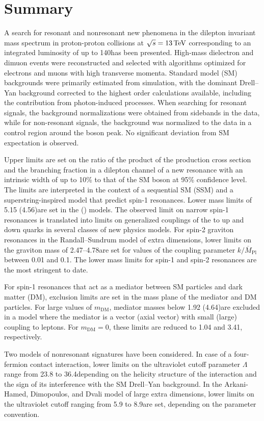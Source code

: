 \documentclass[11pt,twoside,a4paper,cmspaper,final,collab]{cms-tdr}
\begin{document}
\section{Summary}
A search for resonant and nonresonant new phenomena in the dilepton invariant mass spectrum in proton-proton collisions at $\sqrt{s} = 13\,\text{Te\hspace{-.08em}V}$ corresponding to an integrated luminosity of up to 140\fbinv has been presented. High-mass dielectron and dimuon events were reconstructed and selected with algorithms optimized for electrons and muons with high transverse momenta. Standard model (SM) backgrounds were primarily estimated from simulation, with the dominant Drell--Yan background corrected to the highest order calculations available, including the contribution from photon-induced processes. When searching for resonant signals, the background normalizations were obtained from sidebands in the data, while for non-resonant signals, the background was normalized to the data in a control region around the \PZ boson peak. No significant deviation from SM expectation is observed. 

Upper limits are set on the ratio of the product of the production cross section and the branching fraction in a dilepton channel of a new resonance with an intrinsic width of up to 10\% to that of the SM \PZ boson at 95\% confidence level. The limits are interpreted in the context of a sequential SM (SSM) and a superstring-inspired model that predict spin-1 resonances. Lower mass limits of 5.15 (4.56)\TeV are set in the \ZPSSM (\ZPPSI) models. The observed limit on narrow spin-1 resonances is translated into limits on generalized couplings of the \PZpr to up and down quarks in several classes of new physics models. For spin-2 graviton resonances in the Randall--Sundrum model of extra dimensions, lower limits on the graviton mass of 2.47--4.78\TeV are set for values of the coupling parameter $k/\overline{M}_{\mathrm{Pl}}$ between 0.01 and 0.1. The lower mass limits for spin-1 and spin-2 resonances are the most stringent to date.

For spin-1 resonances that act as a mediator between SM particles and dark matter (DM), exclusion limits are set in the mass plane of the mediator and DM particles. For large values of $m_{\mathrm{DM}}$, mediator masses below 1.92 (4.64)\TeV are excluded in a model where the mediator is a vector (axial vector) with small (large) coupling to leptons. For $m_{\mathrm{DM}} = 0$, these limits are reduced to 1.04 and 3.41\TeV, respectively. 

Two models of nonresonant signatures have been considered. In case of a four-fermion contact interaction, lower limits on the ultraviolet cutoff parameter $\Lambda$ range from 23.8 to 36.4\TeV depending on the helicity structure of the interaction and the sign of its interference with the SM Drell--Yan background. In the Arkani-Hamed, Dimopoulos, and Dvali model of large extra dimensions, lower limits on the ultraviolet cutoff ranging from 5.9 to 8.9\TeV are set, depending on the parameter convention.
\end{document}
